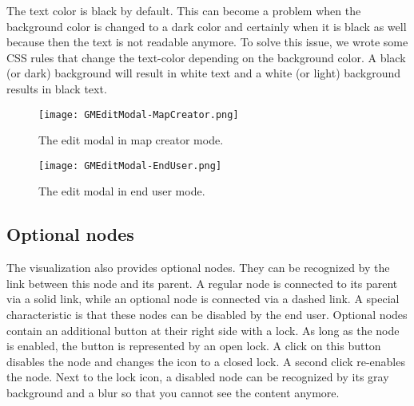 The text color is black by default. This can become a problem when the background color is changed to a dark color and certainly when it is black as well because then the text is not readable anymore. To solve this issue, we wrote some CSS rules that change the text-color depending on the background color. A black (or dark) background will result in white text and a white (or light) background results in black text.

\begin{figure}[H]
	\centering
	\texttt{[image: GMEditModal-MapCreator.png]}
	\caption{The edit modal in map creator mode.}
	\label{fig:gm-editmodal-mapcreator}
\end{figure}

\begin{figure}[H]
	\centering
	\texttt{[image: GMEditModal-EndUser.png]}
	\caption{The edit modal in end user mode.}
	\label{fig:gm-editmodal-enduser}
\end{figure}


\subsection{Optional nodes}\label{sec:optional-nodes}
The visualization also provides optional nodes. They can be recognized by the link between this node and its parent. A regular node is connected to its parent via a solid link, while an optional node is connected via a dashed link. A special characteristic is that these nodes can be disabled by the end user. Optional nodes contain an additional button at their right side with a lock. As long as the node is enabled, the button is represented by an open lock. A click on this button disables the node and changes the icon to a closed lock. A second click re-enables the node. Next to the lock icon, a disabled node can be recognized by its gray background and a blur so that you cannot see the content anymore.














